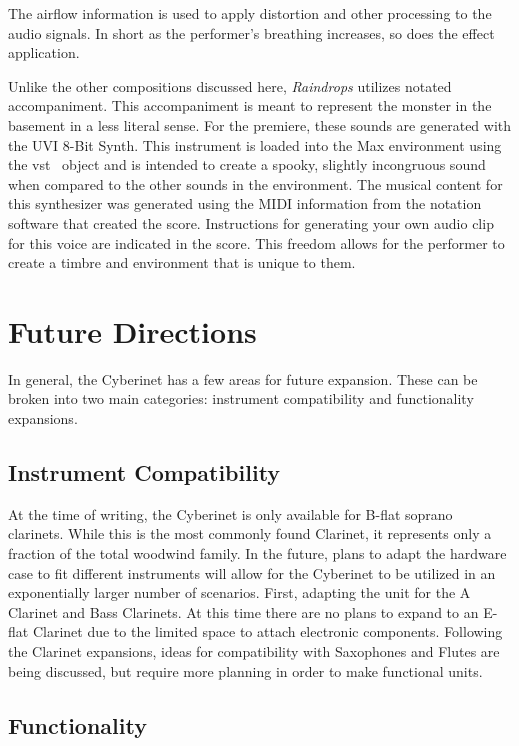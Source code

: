 The airflow information is used to apply distortion and other processing to the audio signals. In short as the performer's breathing increases, so does the effect application.

Unlike the other compositions discussed here, \textit{Raindrops} utilizes notated accompaniment. This accompaniment is meant to represent the monster in the basement in a less literal sense. For the premiere, these sounds are generated with the UVI 8-Bit Synth. This instrument is loaded into the Max environment using the vst~ object and is intended to create a spooky, slightly incongruous sound when compared to the other sounds in the environment. 
The musical content for this synthesizer was generated using the MIDI information from the notation software that created the score. Instructions for generating your own audio clip for this voice are indicated in the score. This freedom allows for the performer to create a timbre and environment that is unique to them.

\chapter{Future Directions}

In general, the Cyberinet has a few areas for future expansion. These can be broken into two main categories: instrument compatibility and functionality expansions. 

\section{Instrument Compatibility}
At the time of writing, the Cyberinet is only available for B-flat soprano clarinets. While this is the most commonly found Clarinet, it represents only a fraction of the total woodwind family. In the future, plans to adapt the hardware case to fit different instruments will allow for the Cyberinet to be utilized in an exponentially larger number of scenarios. 
First, adapting the unit for the A Clarinet and Bass Clarinets. At this time there are no plans to expand to an E-flat Clarinet due to the limited space to attach electronic components.
Following the Clarinet expansions, ideas for compatibility with Saxophones and Flutes are being discussed, but require more planning in order to make functional units.

\section{Functionality}


